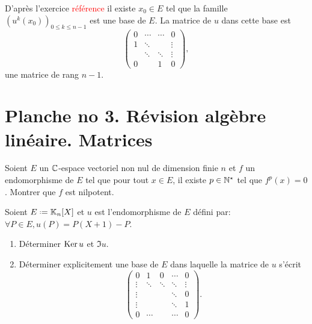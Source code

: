 \begin{solution}
    D'après l'exercice \textcolor{red}{référence} il existe $x_0 \in E$ tel que la famille $\left( u^k(x_0)\right)_{0 \leqslant k \leqslant n-1}$ est une base de $E$. La matrice de $u$ dans cette base est 
    $$
    \begin{pmatrix}
        0 & \cdots & \cdots & 0 \\
        1 & \ddots & & \vdots \\
        & \ddots & \ddots & \vdots \\
        0 & & 1 & 0
    \end{pmatrix},
    $$
    une matrice de rang $n-1$.
\end{solution}

\section{\cite{maths-france} Planche no 3. Révision algèbre linéaire. Matrices}

\begin{exercice}
    Soient $E$ un $\mathbb{C}$-espace vectoriel non nul de dimension finie $n$ et $f$ un endomorphisme de $E$ tel que pour tout $x \in E$, il existe $p \in \mathbb{N}^\star$ tel que $f^p(x) = 0$. Montrer que $f$ est nilpotent. 
\end{exercice}

\begin{exercice}
    Soient $E \defeq \K_n[X]$ et $u$ est l'endomorphisme de $E$ défini par: $\forall P \in E, u(P) = P(X+1) - P$.
    \begin{enumerate}
        \item Déterminer $\mathrm{Ker}\, u$ et $\Im u$.
        \item Déterminer explicitement une base de $E$ dans laquelle la matrice de $u$ s'écrit 
        $$
        \begin{pmatrix}
            0 & 1 & 0 & \cdots & 0 \\
            \vdots & \ddots & \ddots & \ddots & \vdots \\
            \vdots & & & \ddots & 0 \\
            \vdots & & & \ddots & 1 \\
            0 & \cdots & & \cdots & 0
        \end{pmatrix}
        .$$
    \end{enumerate}
\end{exercice}

